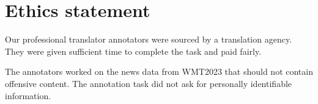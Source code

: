 \section*{Ethics statement}

Our professional translator annotators were sourced by a translation agency. They were given sufficient time to complete the task and paid fairly. 

The annotators worked on the news data from WMT2023 \citep{freitag-etal-2023-results} that should not contain offensive content. The annotation task did not ask for personally identifiable information.